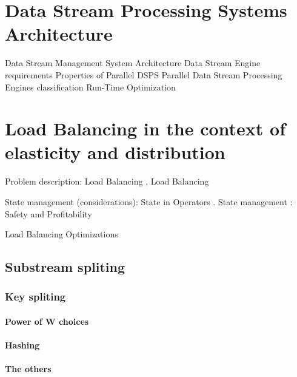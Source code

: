   \section{Data Stream Processing Systems Architecture}
  Data Stream Management System Architecture\cite{chakravarthy2009stream}
  Data Stream Engine requirements  \cite{kamburugamuve2013survey}
  Properties of Parallel DSPS \cite{R_ger_2019}
  Parallel Data Stream Processing Engines classification \cite{R_ger_2019}
  Run-Time Optimization\cite{chakravarthy2009stream}

  \section{Load Balancing in the context of elasticity and distribution}
  Problem description: Load Balancing  \cite{Hirzel_2014},   Load Balancing \cite{R_ger_2019}

  State management (considerations): State in Operators \cite{R_ger_2019}. State management \cite{R_ger_2019}: Safety and Profitability \cite{Schneider_2013R_ger_2019}

  Load Balancing Optimizations

  \subsection{Substream spliting}
  \subsubsection{Key spliting}
  \paragraph{Power of W choices}
  \paragraph{Hashing}
  \paragraph{The others}
